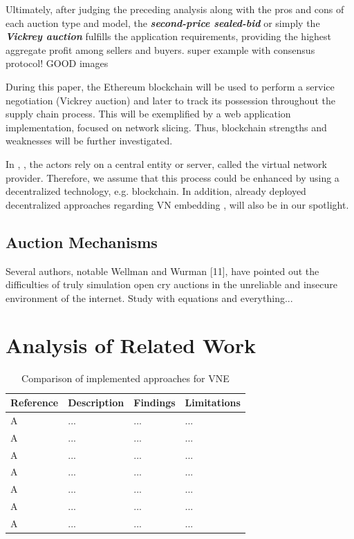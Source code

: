 Ultimately, after judging the preceding analysis along with the pros and cons of each auction type and model, the \textbf{\textit{second-price sealed-bid}} or simply the \textbf{\textit{Vickrey auction}} fulfills the application requirements, providing the highest aggregate profit among sellers and buyers.
\citep{esposito2013general} super example with consensus protocol! GOOD images

 During this paper, the Ethereum blockchain will be used to perform a service negotiation (Vickrey auction) and later to track its possession throughout the supply chain process. This will be exemplified by a web application implementation, focused on network slicing. Thus, blockchain strengths and weaknesses will be further investigated.
 
In \citep{dietrich2017multi}, \citep{zaheer2010multi}, the actors rely on a central entity or server, called the virtual network provider. Therefore, we assume that this process could be enhanced by using a decentralized technology, e.g. blockchain. In addition, already deployed decentralized approaches regarding VN embedding \citep{esposito2013general}, \citep{chowdhury2010polyvine} will also be in our spotlight.
 
\subsection{Auction Mechanisms}

Several authors, notable Wellman and Wurman [11], have pointed out the difficulties of truly simulation open cry auctions in the unreliable and insecure environment of the internet.
Study \citep{ausubel2006lovely} with equations and everything...


\section{Analysis of Related Work}


\begin{table}[htbp]
	\myfloatalign \footnotesize
	\begin{tabularx}{\textwidth}{p{4cm}p{4cm}p{4cm}p{4cm}}
		\textbf{Reference} & \textbf{Description} & \textbf{Findings} & 		        \textbf{Limitations}  \\ 
		\hline
		A   &  ... &  ... &  ... \\ 
		A   &  ... &  ... &  ... \\ 
		A   &  ... &  ... &  ... \\ 
		A   &  ... &  ... &  ... \\ 
		A   &  ... &  ... &  ... \\ 
		A   &  ... &  ... &  ... \\ 							
		A   &  ... &  ... &  ... \\  
		\hline
	\end{tabularx}
	\caption{Comparison of implemented approaches for VNE}
	\label{tab:VNEComparison}
\end{table}


